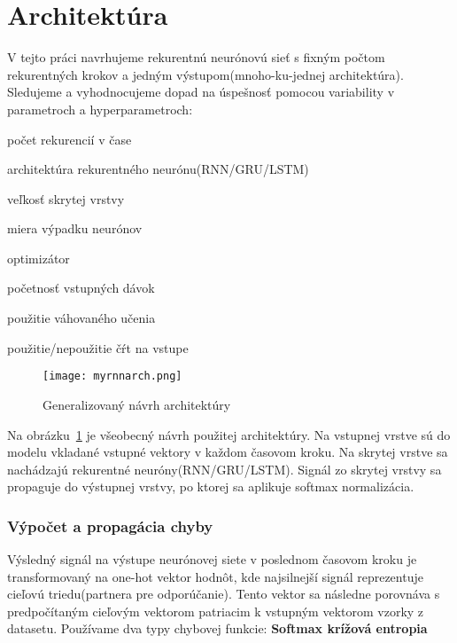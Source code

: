 \section{Architektúra}

V tejto práci navrhujeme rekurentnú neurónovú sieť s fixným počtom rekurentných krokov a jedným výstupom(mnoho-ku-jednej architektúra). Sledujeme a vyhodnocujeme dopad na úspešnosť pomocou variability v parametroch a hyperparametroch:

\begin{my_itemize}
	\item počet rekurencií v čase
	\item architektúra rekurentného neurónu(RNN/GRU/LSTM)
	\item veľkosť skrytej vrstvy
	\item miera výpadku neurónov
	\item optimizátor
	\item početnosť vstupných dávok
	\item použitie váhovaného učenia
	\item použitie/nepoužitie čŕt na vstupe
\end{my_itemize}

\begin{figure}[H]
\begin{center}
\texttt{[image: myrnnarch.png]}\end{center}
\caption[myrnnarch]{Generalizovaný návrh architektúry}
\label{fig:myrnnarch}
\end{figure} 

Na obrázku~\ref{fig:myrnnarch} je všeobecný návrh použitej architektúry. Na vstupnej vrstve sú do modelu vkladané vstupné vektory v každom časovom kroku. Na skrytej vrstve sa nachádzajú rekurentné neuróny(RNN/GRU/LSTM). Signál zo skrytej vrstvy sa propaguje do výstupnej vrstvy, po ktorej sa aplikuje softmax normalizácia.

\subsubsection*{Výpočet a propagácia chyby}
Výsledný signál na výstupe neurónovej siete v poslednom časovom kroku je transformovaný na one-hot vektor hodnôt, kde najsilnejší signál reprezentuje cieľovú triedu(partnera pre odporúčanie). Tento vektor sa následne porovnáva s predpočítaným cieľovým vektorom patriacim k vstupným vektorom vzorky z datasetu.\newline
Používame dva typy chybovej funkcie:\newline
\textbf{Softmax krížová entropia}\newline

